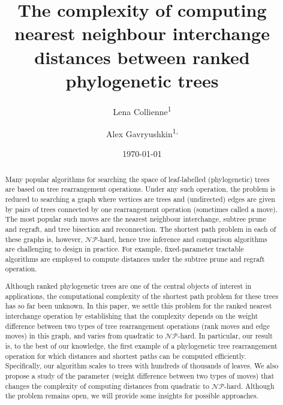 \documentclass[11pt]{amsart}
\title[Computing $\rnni$ distance]{The complexity of computing nearest neighbour interchange distances between ranked phylogenetic trees}
\date{\today}
\author{Lena Collienne\textsuperscript{1}}
\author{Alex Gavryushkin\textsuperscript{1, \Letter}}
\newcommand{\np}{\mathcal{NP}}
\begin{document}
\begin{abstract}
Many popular algorithms for searching the space of leaf-labelled (phylogenetic) trees are based on tree rearrangement operations.
Under any such operation, the problem is reduced to searching a graph where vertices are trees and (undirected) edges are given by pairs of trees connected by one rearrangement operation (sometimes called a move).
The most popular such moves are the nearest neighbour interchange, subtree prune and regraft, and tree bisection and reconnection.
The shortest path problem in each of these graphs is, however, $\np$-hard, hence tree inference and comparison algorithms are challenging to design in practice.
For example, fixed-parameter tractable algorithms are employed to compute distances under the subtree prune and regraft operation.

Although ranked phylogenetic trees are one of the central objects of interest in applications, the computational complexity of the shortest path problem for these trees has so far been unknown.
In this paper, we settle this problem for the ranked nearest interchange operation by establishing that the complexity depends on the weight difference between two types of tree rearrangement operations (rank moves and edge moves) in this graph, and varies from quadratic to $\np$-hard.
In particular, our result is, to the best of our knowledge, the first example of a phylogenetic tree rearrangement operation for which distances and shortest paths can be computed efficiently.
Specifically, our algorithm scales to trees with hundreds of thousands of leaves.
We also propose a study of the parameter (weight difference between two types of moves) that changes the complexity of computing distances from quadratic to $\np$-hard.
Although the problem remains open, we will provide some insights for possible approaches.
\end{abstract}


\maketitle
\thispagestyle{empty}

\newpage

\setcounter{page}{1}
\end{document}
